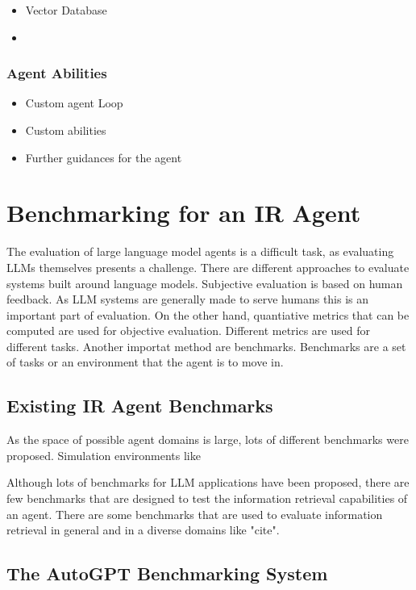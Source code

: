 \documentclass[english, version-2022-01]{uzl-thesis}
\begin{document}
\begin{itemize}
    \item Vector Database
    \item
\end{itemize}
\subsection{Agent Abilities}




\begin{itemize}

    \item Custom agent Loop
    \item Custom abilities
    \item Further guidances for the agent
\end{itemize}

\chapter{Benchmarking for an IR Agent}

The evaluation of large language model agents is a difficult task, as evaluating LLMs themselves presents a challenge.
There are different approaches to evaluate systems built around language models. Subjective evaluation is based on human feedback.
As LLM systems are generally made to serve humans this is an important part of evaluation.
On the other hand, quantiative metrics that can be computed are used for objective evaluation. Different metrics are used for different tasks. Another importat method are benchmarks.
Benchmarks are a set of tasks or an environment that the agent is to move in.

\section{Existing IR Agent Benchmarks}

As the space of possible agent domains is large, lots of different benchmarks were proposed. Simulation environments like

Although lots of benchmarks for LLM applications have been proposed, there are few benchmarks that are designed to test the information retrieval capabilities of an agent.
There are some benchmarks that are used to evaluate information retrieval in general and in a diverse domains like "cite".

\section{The AutoGPT Benchmarking System}
\end{document}
